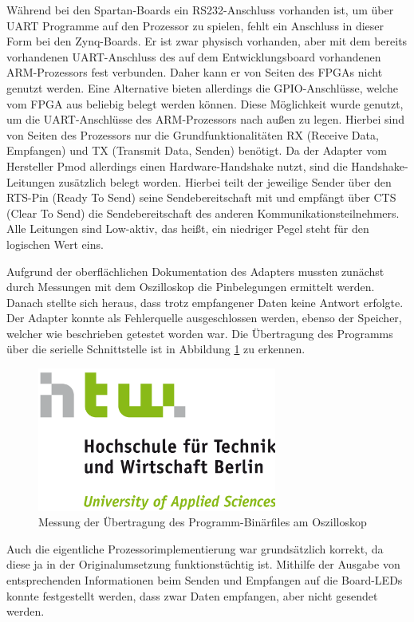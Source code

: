 \documentclass[11pt,a4paper,titlepage]{article}
\begin{document}
Während bei den Spartan-Boards ein RS232-Anschluss vorhanden ist, um über UART Programme auf den Prozessor zu spielen, fehlt ein Anschluss in dieser Form bei den Zynq-Boards. Er ist zwar physisch vorhanden, aber mit dem bereits vorhandenen UART-Anschluss des auf dem Entwicklungsboard vorhandenen ARM-Prozessors fest verbunden. Daher kann er von Seiten des FPGAs nicht genutzt werden. Eine Alternative bieten allerdings die GPIO-Anschlüsse, welche vom FPGA aus beliebig belegt werden können. Diese Möglichkeit wurde genutzt, um die UART-Anschlüsse des ARM-Prozessors nach außen zu legen. Hierbei sind von Seiten des Prozessors nur die Grundfunktionalitäten RX (Receive Data, Empfangen) und TX (Transmit Data, Senden) benötigt. Da der Adapter vom Hersteller Pmod allerdings einen Hardware-Handshake nutzt, sind die Handshake-Leitungen zusätzlich belegt worden. Hierbei teilt der jeweilige Sender über den RTS-Pin (Ready To Send) seine Sendebereitschaft mit und empfängt über CTS (Clear To Send) die Sendebereitschaft des anderen Kommunikationsteilnehmers. Alle Leitungen sind Low-aktiv, das heißt, ein niedriger Pegel steht für den logischen Wert eins.

Aufgrund der oberflächlichen Dokumentation des Adapters mussten zunächst durch Messungen mit dem Oszilloskop die Pinbelegungen ermittelt werden. Danach stellte sich heraus, dass trotz empfangener Daten keine Antwort erfolgte. Der Adapter konnte als Fehlerquelle ausgeschlossen werden, ebenso der Speicher, welcher wie beschrieben getestet worden war. Die Übertragung des Programms über die serielle Schnittstelle ist in Abbildung \ref{img:UART_messung} zu erkennen.

\begin{figure}[!ht]
\centering
\includegraphics[width=0.7\textwidth]{images/htw_hochschule.png}
\caption{Messung der Übertragung des Programm-Binärfiles am Oszilloskop}
\label{img:UART_messung}
\end{figure}

Auch die eigentliche Prozessorimplementierung war grundsätzlich korrekt, da diese ja in der Originalumsetzung funktionstüchtig ist. Mithilfe der Ausgabe von entsprechenden Informationen beim Senden und Empfangen auf die Board-LEDs konnte festgestellt werden, dass zwar Daten empfangen, aber nicht gesendet werden.
\end{document}
